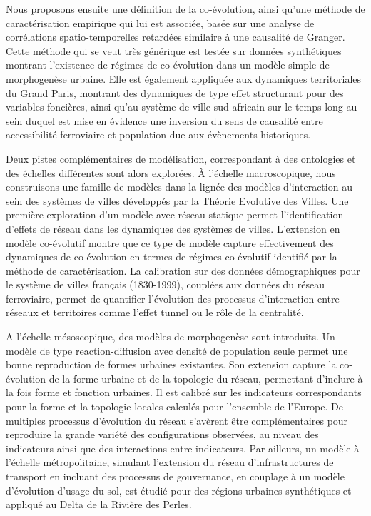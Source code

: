 \documentclass[9pt]{article}
\begin{document}
Nous proposons ensuite une définition de la co-évolution, ainsi qu'une méthode de caractérisation empirique qui lui est associée, basée sur une analyse de corrélations spatio-temporelles retardées similaire à une causalité de Granger. Cette méthode qui se veut très générique est testée sur données synthétiques montrant l'existence de régimes de co-évolution dans un modèle simple de morphogenèse urbaine. Elle est également appliquée aux dynamiques territoriales du Grand Paris, montrant des dynamiques de type effet structurant pour des variables foncières, ainsi qu'au système de ville sud-africain sur le temps long au sein duquel est mise en évidence une inversion du sens de causalité entre accessibilité ferroviaire et population due aux évènements historiques.


Deux pistes complémentaires de modélisation, correspondant à des ontologies et des échelles différentes sont alors explorées. À l'échelle macroscopique, nous construisons une famille de modèles dans la lignée des modèles d'interaction au sein des systèmes de villes développés par la Théorie Evolutive des Villes. Une première exploration d'un modèle avec réseau statique permet l'identification d'effets de réseau dans les dynamiques des systèmes de villes. L'extension en modèle co-évolutif montre que ce type de modèle capture effectivement des dynamiques de co-évolution en termes de régimes co-évolutif identifié par la méthode de caractérisation. La calibration sur des données démographiques pour le système de villes français (1830-1999), couplées aux données du réseau ferroviaire, permet de quantifier l'évolution des processus d'interaction entre réseaux et territoires comme l'effet tunnel ou le rôle de la centralité.


A l'échelle mésoscopique, des modèles de morphogenèse sont introduits. Un modèle de type reaction-diffusion avec densité de population seule permet une bonne reproduction de formes urbaines existantes. Son extension capture la co-évolution de la forme urbaine et de la topologie du réseau, permettant d'inclure à la fois forme et fonction urbaines. Il est calibré sur les indicateurs correspondants pour la forme et la topologie locales calculés pour l'ensemble de l'Europe. De multiples processus d'évolution du réseau s'avèrent être complémentaires pour reproduire la grande variété des configurations observées, au niveau des indicateurs ainsi que des interactions entre indicateurs. Par ailleurs, un modèle à l'échelle métropolitaine, simulant l'extension du réseau d'infrastructures de transport en incluant des processus de gouvernance, en couplage à un modèle d'évolution d'usage du sol, est étudié pour des régions urbaines synthétiques et appliqué au Delta de la Rivière des Perles.
\end{document}
